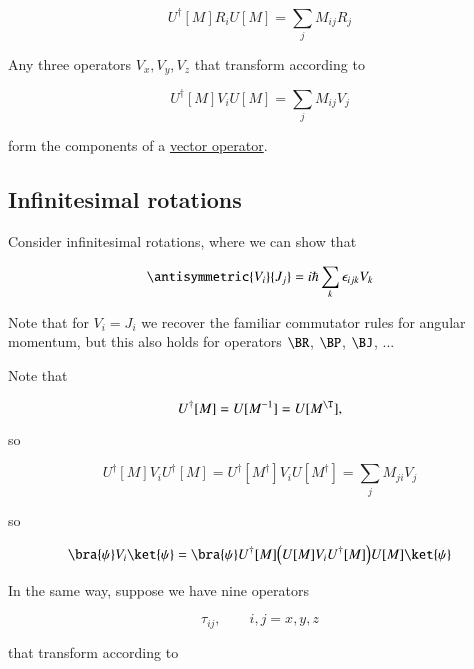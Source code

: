 \begin{equation}\label{eqn:qmTwoL19:50}
U^\dagger[M] R_i U[M] = \sum_j M_{ij} R_j
\end{equation}

Any three operators $V_x, V_y, V_z$ that transform according to

\begin{equation}\label{eqn:qmTwoL19:70}
U^\dagger[M] V_i U[M] = \sum_j M_{ij} V_j
\end{equation}

form the components of a \underline{vector operator}.

\subsection{Infinitesimal rotations}

Consider infinitesimal rotations, where we can show that

\begin{equation}\label{eqn:qmTwoL19:90}
\antisymmetric{V_i}{J_j} = i \hbar \sum_k \epsilon_{ijk} V_k
\end{equation}

Note that for $V_i = J_i$ we recover the familiar commutator rules for angular momentum, but this also holds for operators $\BR$, $\BP$, $\BJ$, ...

Note that

\begin{equation}\label{eqn:qmTwoL19:110}
U^\dagger[M] = U[M^{-1}] = U[M^\T],
\end{equation}

so

\begin{equation}\label{eqn:qmTwoL19:130}
U^\dagger[M] V_i U^\dagger[M] = U^\dagger[M^\dagger] V_i U[M^\dagger] = \sum_j M_{ji} V_j
\end{equation}

so

\begin{equation}\label{eqn:qmTwoL19:150}
\bra{\psi} V_i \ket{\psi}
=
\bra{\psi}
U^\dagger[M] \Bigl( U[M] V_i U^\dagger[M] \Bigr) U[M]
\ket{\psi}
\end{equation}

In the same way, suppose we have nine operators

\begin{equation}\label{eqn:qmTwoL19:170}
\tau_{ij}, \qquad i, j = x, y, z
\end{equation}

that transform according to

